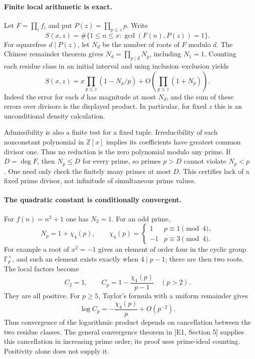 \documentclass[11pt]{article}
\begin{document}
\paragraph{Finite local arithmetic is exact.}
Let $F=\prod_i f_i$ and put $P(z)=\prod_{p\leq z}p$. Write
\[
 S(x,z)=\#\{1\leq n\leq x:\gcd(F(n),P(z))=1\}.
\]
For squarefree $d\mid P(z)$, let $N_d$ be the number of roots of $F$
modulo $d$. The Chinese remainder theorem gives
$N_d=\prod_{p\mid d}N_p$, including $N_1=1$. Counting each residue class
in an initial interval and using inclusion--exclusion yields
\[
 S(x,z)=x\prod_{p\leq z}(1-N_p/p)
       +O\left(\prod_{p\leq z}(1+N_p)\right).           \tag{83.1}
\]
Indeed the error for each $d$ has magnitude at most $N_d$, and the sum
of these errors over divisors is the displayed product. In particular,
for fixed $z$ this is an unconditional density calculation.

Admissibility is also a finite test for a fixed tuple. Irreducibility of
each nonconstant polynomial in $\mathbb Z[x]$ implies its coefficients
have greatest common divisor one. Thus no reduction is the zero
polynomial modulo any prime. If $D=\deg F$, then $N_p\leq D$ for every
prime, so primes $p>D$ cannot violate $N_p<p$. One need only check the
finitely many primes at most $D$. This certifies lack of a fixed prime
divisor, not infinitude of simultaneous prime values.

\paragraph{The quadratic constant is conditionally convergent.}
For $f(n)=n^2+1$ one has $N_2=1$. For an odd prime,
\[
 N_p=1+\chi_4(p),\qquad
 \chi_4(p)=\begin{cases}1&p\equiv1\pmod4,\\-1&p\equiv3\pmod4.
                         \end{cases}
\]
For example a root of $x^2=-1$ gives an element of order four in the
cyclic group $\mathbb F_p^\times$, and such an element exists exactly
when $4\mid p-1$; there are then two roots. The local factors become
\[
 C_2=1,\qquad C_p=1-\frac{\chi_4(p)}{p-1}\quad(p>2).   \tag{83.2}
\]
They are all positive. For $p\geq5$, Taylor's formula with a uniform
remainder gives
\[
 \log C_p=-\frac{\chi_4(p)}p+O(p^{-2}).                 \tag{83.3}
\]
Thus convergence of the logarithmic product depends on cancellation
between the two residue classes. The general convergence theorem in
[E1, Section 5] supplies this cancellation in increasing prime order;
its proof uses prime-ideal counting. Positivity alone does not supply it.
\end{document}
